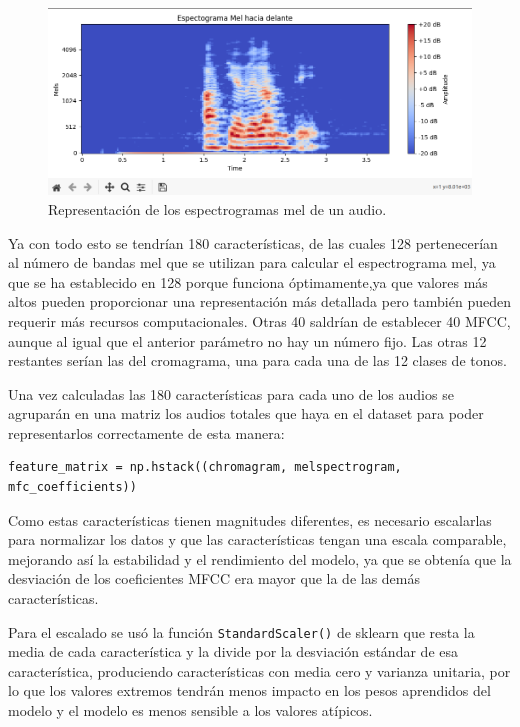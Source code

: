 \begin{figure}[H]
  \centering
  \includegraphics[scale=0.4]{figs/mel_spectrogram} %
  \caption{ Representación de los espectrogramas mel de un audio.}
  \label{fig:mel}
\end{figure}

Ya con todo esto se tendrían 180 características, de las cuales 128 pertenecerían al número de bandas mel que se utilizan para calcular el espectrograma mel, ya que se ha establecido en 128 porque funciona óptimamente,ya que valores más altos pueden proporcionar una representación más detallada pero también pueden requerir más recursos computacionales. Otras 40 saldrían de establecer 40 MFCC, aunque al igual que el anterior parámetro no hay un número fijo. Las otras 12 restantes serían las del cromagrama, una para cada una de las 12 clases de tonos.

Una vez calculadas las 180 características para cada uno de los audios se agruparán en una matriz los audios totales que haya en el dataset para poder representarlos correctamente de esta manera:

\begin{verbatim}
feature_matrix = np.hstack((chromagram, melspectrogram, mfc_coefficients))
\end{verbatim}

Como estas características tienen magnitudes diferentes, es necesario escalarlas para normalizar los datos y que las características tengan una escala comparable, mejorando así la estabilidad y el rendimiento del modelo, ya que se obtenía que la desviación de los coeficientes MFCC era mayor que la de las demás características. 

Para el escalado se usó la función \verb|StandardScaler()| de sklearn que resta la media de cada característica y la divide por la desviación estándar de esa característica, produciendo características con media cero y varianza unitaria, por lo que los valores extremos tendrán menos impacto en los pesos aprendidos del modelo y el modelo es menos sensible a los valores atípicos. 


